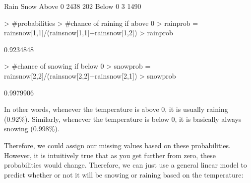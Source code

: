 \documentclass[11pt, a4paper]{article}
\begin{document}
\begin{Schunk}
\begin{Soutput}
          Rain Snow
  Above 0 2438  202
  Below 0    3 1490
\end{Soutput}
\begin{Sinput}
> #probabilities
> #chance of raining if above 0
> rainprob = rainsnow[1,1]/(rainsnow[1,1]+rainsnow[1,2])
> rainprob
\end{Sinput}
\begin{Soutput}
[1] 0.9234848
\end{Soutput}
\begin{Sinput}
> #chance of snowing if below 0
> snowprob = rainsnow[2,2]/(rainsnow[2,2]+rainsnow[2,1])
> snowprob
\end{Sinput}
\begin{Soutput}
[1] 0.9979906
\end{Soutput}
\end{Schunk}

In other words, whenever the temperature is above 0, it is usually raining (0.92\%). Similarly, whenever the temperature is below 0, it is basically always snowing (0.998\%).
\par
Therefore, we could assign our missing values based on these probabilities. However, it is intuitively true that as you get further from zero, these probabilities would change. Therefore, we can just use a general linear model to predict whether or not it will be snowing or raining based on the temperature:
\end{document}
